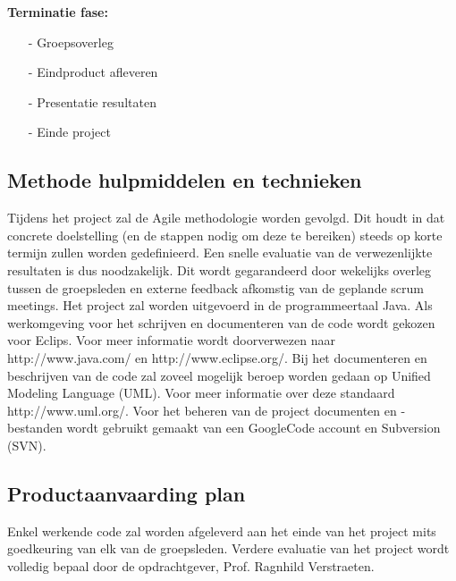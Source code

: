\documentclass{article}
\begin{document}
\textbf{Terminatie fase:}
\begin{itemize}
\item[-] Groepsoverleg\\[-5mm]
\item[-] Eindproduct afleveren\\[-5mm]
\item[-] Presentatie resultaten\\[-5mm]
\item[-] Einde project\\[-5mm]
\end{itemize}


\subsection{Methode hulpmiddelen en technieken}

Tijdens het project zal de Agile methodologie worden gevolgd. Dit houdt in dat concrete doelstelling (en de stappen nodig om deze te bereiken) steeds op korte termijn zullen worden gedefinieerd. Een snelle evaluatie van de verwezenlijkte resultaten is dus noodzakelijk. Dit wordt gegarandeerd door wekelijks overleg tussen de groepsleden en externe feedback afkomstig van de geplande scrum meetings.
Het project zal worden uitgevoerd in de programmeertaal Java. Als werkomgeving voor het schrijven en documenteren van de code wordt gekozen voor Eclips. Voor meer informatie wordt doorverwezen naar http://www.java.com/ en http://www.eclipse.org/.
Bij het documenteren en beschrijven van de code zal zoveel mogelijk beroep worden gedaan op Unified Modeling Language (UML). Voor meer informatie over deze standaard http://www.uml.org/. Voor het beheren van de project documenten en -bestanden wordt gebruikt gemaakt van een GoogleCode account en Subversion (SVN).


\subsection{Productaanvaarding plan}

Enkel werkende code zal worden afgeleverd aan het einde van het project mits goedkeuring van elk van de groepsleden. Verdere evaluatie van het project wordt volledig bepaal door de opdrachtgever, Prof. Ragnhild Verstraeten.
\end{document}
